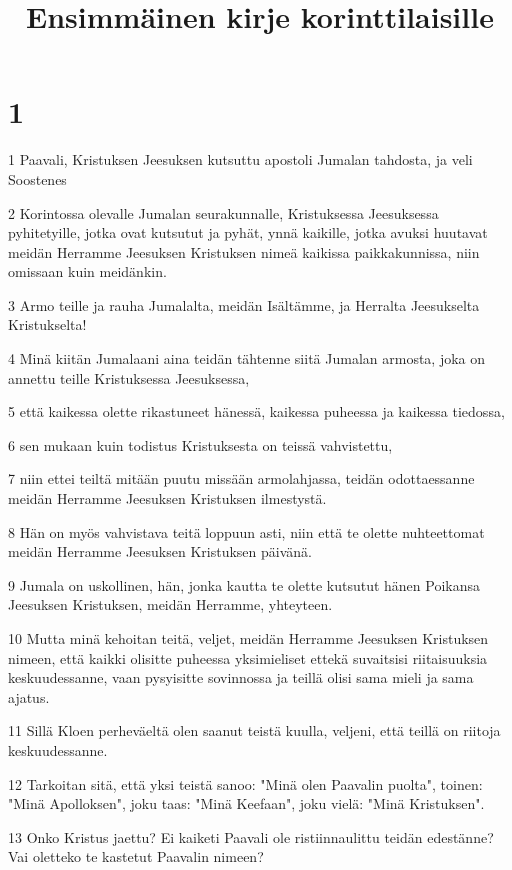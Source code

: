 

\title{Ensimmäinen kirje korinttilaisille}


\chapter{1}

\par 1 Paavali, Kristuksen Jeesuksen kutsuttu apostoli Jumalan tahdosta, ja veli Soostenes
\par 2 Korintossa olevalle Jumalan seurakunnalle, Kristuksessa Jeesuksessa pyhitetyille, jotka ovat kutsutut ja pyhät, ynnä kaikille, jotka avuksi huutavat meidän Herramme Jeesuksen Kristuksen nimeä kaikissa paikkakunnissa, niin omissaan kuin meidänkin.
\par 3 Armo teille ja rauha Jumalalta, meidän Isältämme, ja Herralta Jeesukselta Kristukselta!
\par 4 Minä kiitän Jumalaani aina teidän tähtenne siitä Jumalan armosta, joka on annettu teille Kristuksessa Jeesuksessa,
\par 5 että kaikessa olette rikastuneet hänessä, kaikessa puheessa ja kaikessa tiedossa,
\par 6 sen mukaan kuin todistus Kristuksesta on teissä vahvistettu,
\par 7 niin ettei teiltä mitään puutu missään armolahjassa, teidän odottaessanne meidän Herramme Jeesuksen Kristuksen ilmestystä.
\par 8 Hän on myös vahvistava teitä loppuun asti, niin että te olette nuhteettomat meidän Herramme Jeesuksen Kristuksen päivänä.
\par 9 Jumala on uskollinen, hän, jonka kautta te olette kutsutut hänen Poikansa Jeesuksen Kristuksen, meidän Herramme, yhteyteen.
\par 10 Mutta minä kehoitan teitä, veljet, meidän Herramme Jeesuksen Kristuksen nimeen, että kaikki olisitte puheessa yksimieliset ettekä suvaitsisi riitaisuuksia keskuudessanne, vaan pysyisitte sovinnossa ja teillä olisi sama mieli ja sama ajatus.
\par 11 Sillä Kloen perheväeltä olen saanut teistä kuulla, veljeni, että teillä on riitoja keskuudessanne.
\par 12 Tarkoitan sitä, että yksi teistä sanoo: "Minä olen Paavalin puolta", toinen: "Minä Apolloksen", joku taas: "Minä Keefaan", joku vielä: "Minä Kristuksen".
\par 13 Onko Kristus jaettu? Ei kaiketi Paavali ole ristiinnaulittu teidän edestänne? Vai oletteko te kastetut Paavalin nimeen?
